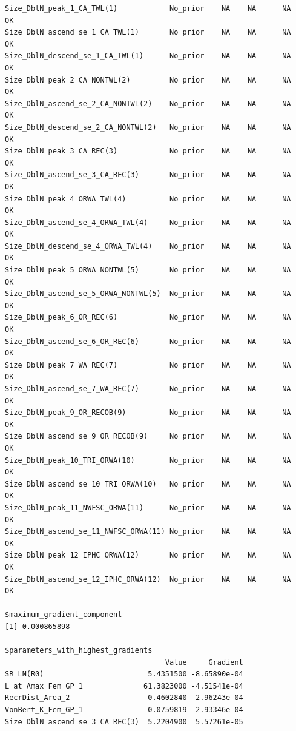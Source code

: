 \documentclass[
]{scrartcl}
\begin{document}
\begin{verbatim}
Size_DblN_peak_1_CA_TWL(1)            No_prior    NA    NA      NA         OK
Size_DblN_ascend_se_1_CA_TWL(1)       No_prior    NA    NA      NA         OK
Size_DblN_descend_se_1_CA_TWL(1)      No_prior    NA    NA      NA         OK
Size_DblN_peak_2_CA_NONTWL(2)         No_prior    NA    NA      NA         OK
Size_DblN_ascend_se_2_CA_NONTWL(2)    No_prior    NA    NA      NA         OK
Size_DblN_descend_se_2_CA_NONTWL(2)   No_prior    NA    NA      NA         OK
Size_DblN_peak_3_CA_REC(3)            No_prior    NA    NA      NA         OK
Size_DblN_ascend_se_3_CA_REC(3)       No_prior    NA    NA      NA         OK
Size_DblN_peak_4_ORWA_TWL(4)          No_prior    NA    NA      NA         OK
Size_DblN_ascend_se_4_ORWA_TWL(4)     No_prior    NA    NA      NA         OK
Size_DblN_descend_se_4_ORWA_TWL(4)    No_prior    NA    NA      NA         OK
Size_DblN_peak_5_ORWA_NONTWL(5)       No_prior    NA    NA      NA         OK
Size_DblN_ascend_se_5_ORWA_NONTWL(5)  No_prior    NA    NA      NA         OK
Size_DblN_peak_6_OR_REC(6)            No_prior    NA    NA      NA         OK
Size_DblN_ascend_se_6_OR_REC(6)       No_prior    NA    NA      NA         OK
Size_DblN_peak_7_WA_REC(7)            No_prior    NA    NA      NA         OK
Size_DblN_ascend_se_7_WA_REC(7)       No_prior    NA    NA      NA         OK
Size_DblN_peak_9_OR_RECOB(9)          No_prior    NA    NA      NA         OK
Size_DblN_ascend_se_9_OR_RECOB(9)     No_prior    NA    NA      NA         OK
Size_DblN_peak_10_TRI_ORWA(10)        No_prior    NA    NA      NA         OK
Size_DblN_ascend_se_10_TRI_ORWA(10)   No_prior    NA    NA      NA         OK
Size_DblN_peak_11_NWFSC_ORWA(11)      No_prior    NA    NA      NA         OK
Size_DblN_ascend_se_11_NWFSC_ORWA(11) No_prior    NA    NA      NA         OK
Size_DblN_peak_12_IPHC_ORWA(12)       No_prior    NA    NA      NA         OK
Size_DblN_ascend_se_12_IPHC_ORWA(12)  No_prior    NA    NA      NA         OK

$maximum_gradient_component
[1] 0.000865898

$parameters_with_highest_gradients
                                     Value     Gradient
SR_LN(R0)                        5.4351500 -8.65890e-04
L_at_Amax_Fem_GP_1              61.3823000 -4.51541e-04
RecrDist_Area_2                  0.4602840  2.96243e-04
VonBert_K_Fem_GP_1               0.0759819 -2.93346e-04
Size_DblN_ascend_se_3_CA_REC(3)  5.2204900  5.57261e-05


\end{verbatim}
\end{document}
